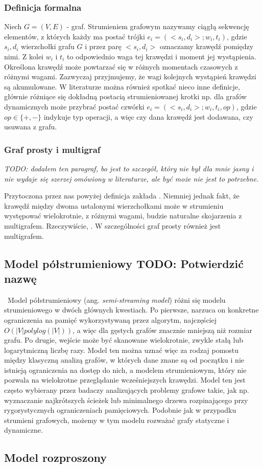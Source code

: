         \subsubsection*{Definicja formalna}
            Niech $G = (V,E)$ - graf. Strumieniem grafowym nazywamy ciągłą sekwencję elementów, z których każdy ma postać trójki $e_i = (<s_i, d_i>; w_i, t_i)$, gdzie $s_i, d_i$ wierzchołki grafu $G$ i przez parę $<s_i, d_i>$ oznaczamy krawędź pomiędzy nimi. Z kolei $w_i$ i $t_i$ to odpowiednio waga tej krawędzi i moment jej wystąpienia. Określona krawędź może powtarzać się w różnych momentach czasowych z różnymi wagami. Zazwyczaj przyjmujemy, że wagi kolejnych wystąpień krawędzi są akumulowane. W literaturze można również spotkać nieco inne definicje, głównie różniące się dokładną postacią strumieniowanej krotki np. dla grafów dynamicznych może przybrać postać czwórki $e_i = (<s_i, d_i>; w_i, t_i, op)$, gdzie $op \in \{+, -\}$ indykuje typ operacji, a więc czy dana krawędź jest dodawana, czy usuwana z grafu\cite{Pacaci_Bonifati_Özsu_2020}.    
        
        \subsubsection*{Graf prosty i multigraf}
            \emph{TODO: dodałem ten paragraf, bo jest to szczegół, który nie był dla mnie jasny i nie wydaje się szerzej omówiony w literaturze, ale być może nie jest to potrzebne.}
        
            Przytoczona przez nas powyżej definicja zakłada . Niemniej jednak fakt, że krawędź między dwoma ustalonymi wierzchołkami może w strumieniu występować wielokrotnie, z różnymi wagami, budzie naturalne skojarzenia z multigrafem. Rzeczywiście, . W szczególności graf prosty również jest multigrafem.     

    \subsection{Model półstrumieniowy TODO: Potwierdzić nazwę}\
        Model półstrumieniowy (ang. \emph{semi-streaming model})\cite{Feigenbaum_Kannan_McGregor_Suri_Zhang_2005} różni się modelu strumieniowego w dwóch głównych kwestiach. Po pierwsze, narzuca on konkretne ograniczenia na pamięć wykorzystywaną przez algorytm, najczęściej $O(|V| polylog(|V|))$, a więc dla gęstych grafów znacznie mniejszą niż rozmiar grafu. Po drugie, wejście może być skanowane wielokrotnie, zwykle stałą lub logarytmiczną liczbę razy. Model ten można uznać więc za rodzaj pomostu między klasyczną analizą grafów, w których dane znane są od początku i nie istnieją ograniczenia na dostęp do nich, a modelem strumieniowym, który nie pozwala na wielokrotne przeglądanie wcześniejszych krawędzi. Model ten jest często wybierany przez badaczy analizujących problemy grafowe takie, jak np.  wyznaczanie najkrótszych ścieżek \cite{Elkin_Trehan_2022} lub minimalnego drzewa rozpinającego \cite{Ahn_Guha_McGregor_2012} przy rygorystycznych ograniczeniach pamięciowych. Podobnie jak w przypadku strumieni grafowych, możemy w tym modelu rozważać grafy statyczne i dynamiczne.

    \subsection{Model rozproszony}